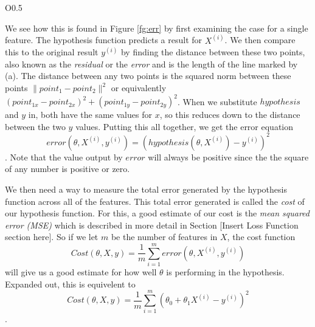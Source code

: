 \documentclass{book}[a5paper]
\begin{document}
\begin{wrapfigure}{O}{0.5\textwidth}
    \centering
    \caption{Visual representation of the distance between expected and actual
    results.}
    \label{fg:err}
\end{wrapfigure}

We see how this is found in Figure \ref{fg:err} by first examining the case for
a single feature. The hypothesis function predicts a result for $X^{(i)}$. We
then compare this to the original result $y^{(i)}$ by finding the distance
between these two points, also known as the \emph{residual} or the \emph{error}
and is the length of the line marked by (a). The distance between any two points
is the squared norm between these points $\| point_1 - point_2 \|^2$ or
equivalently $(point_{1x}-point_{2x})^2 + (point_{1y}-point_{2y})^2$. When we
substitute $hypothesis$ and $y$ in, both have the same values for $x$, so this
reduces down to the distance between the two $y$ values. Putting this all
together, we get the error equation 
\begin{equation}
    error(\theta, X^{(i)}, y^{(i)}) = (hypothesis(\theta, X^{(i)}) - y^{(i)})^2
\end{equation}
. Note that the value output by $error$ will always be positive since the the
square of any number is positive or zero.

We then need a way to measure the total error generated by the hypothesis
function across all of the features. This total error generated is called the
\emph{cost} of our hypothesis function. For this, a good estimate of our cost is
the \emph{mean squared error (MSE)} which is described in more detail in Section
[Insert Loss Function section here]. So if we let $m$ be the number of features
in $X$, the cost function
\begin{equation}
    Cost(\theta, X, y) = \frac{1}{m}\sum_{i=1}^m error(\theta, X^{(i)}, y^{(i)})
\end{equation}
will give us a good estimate for how well $\theta$ is performing in
the hypothesis. Expanded out, this is equivelent to
\begin{equation}
    Cost(\theta, X, y) = \frac{1}{m}\sum_{i=1}^m (\theta_0 + \theta_1X^{(i)} -
    y^{(i)})^2
\end{equation}
.
\end{document}

